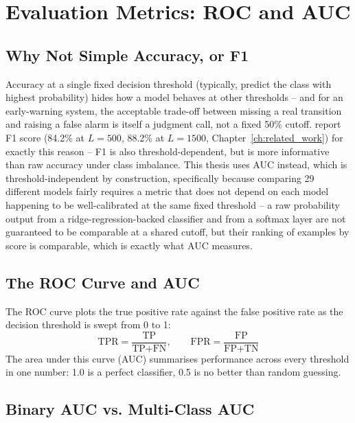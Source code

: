 \section{Evaluation Metrics: ROC and AUC}
\label{sec:evaluation_metrics}

\subsection{Why Not Simple Accuracy, or F1}

Accuracy at a single fixed decision threshold (typically, predict the class with highest probability) hides how a model behaves at other thresholds -- and for an early-warning system, the acceptable trade-off between missing a real transition and raising a false alarm is itself a judgment call, not a fixed 50\% cutoff. \citet{bury2021} report F1 score (84.2\% at $L=500$, 88.2\% at $L=1500$, Chapter~\ref{ch:related_work}) for exactly this reason -- F1 is also threshold-dependent, but is more informative than raw accuracy under class imbalance. This thesis uses AUC instead, which is threshold-independent by construction, specifically because comparing 29 different models fairly requires a metric that does not depend on each model happening to be well-calibrated at the same fixed threshold -- a raw probability output from a ridge-regression-backed classifier and from a softmax layer are not guaranteed to be comparable at a shared cutoff, but their ranking of examples by score is comparable, which is exactly what AUC measures.

\subsection{The ROC Curve and AUC}

The ROC curve plots the true positive rate against the false positive rate as the decision threshold is swept from 0 to 1:
\begin{equation}
    \text{TPR} = \frac{\text{TP}}{\text{TP}+\text{FN}}, \qquad
    \text{FPR} = \frac{\text{FP}}{\text{FP}+\text{TN}}
\end{equation}
The area under this curve (AUC) summarises performance across every threshold in one number: 1.0 is a perfect classifier, 0.5 is no better than random guessing.

\subsection{Binary AUC vs. Multi-Class AUC}

